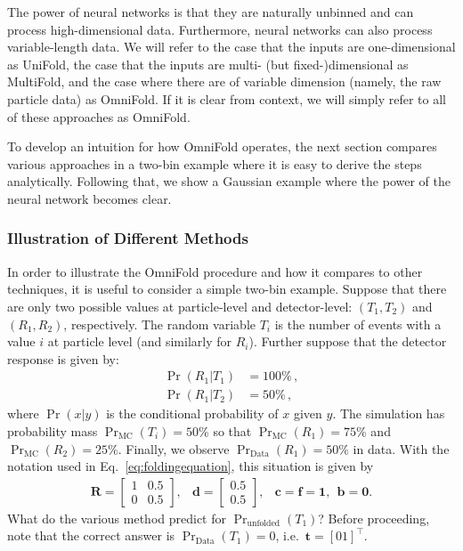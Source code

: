 The power of neural networks is that they are naturally unbinned and can process high-dimensional data.  Furthermore, neural networks can also process variable-length data.  We will refer to the case that the inputs are one-dimensional as UniFold, the case that the inputs are multi- (but fixed-)dimensional as MultiFold, and the case where there are of variable dimension (namely, the raw particle data) as OmniFold.  If it is clear from context, we will simply refer to all of these approaches as OmniFold.

To develop an intuition for how OmniFold operates, the next section compares various approaches in a two-bin example where it is easy to derive the steps analytically.  Following that, we show a Gaussian example where the power of the neural network becomes clear.

\subsubsection{Illustration of Different Methods}

In order to illustrate the OmniFold procedure and how it compares to other techniques, it is useful to consider a simple two-bin example.  Suppose that there are only two possible values at particle-level and detector-level: $(T_1,T_2)$ and $(R_1,R_2)$, respectively.  The random variable $T_i$ is the number of events with a value $i$ at particle level (and similarly for $R_i$).  Further suppose that the detector response is given by:
%
\begin{align}
\Pr(R_1|T_1)&=100\%\,,\\
\Pr(R_1|T_2)&=50\%\,,
\end{align}
%
where $\Pr(x|y)$ is the conditional probability of $x$ given $y$.  The simulation has probability mass $\Pr_\text{MC}(T_i)=50\%$ so that $\Pr_\text{MC}(R_1)=75\%$ and $\Pr_\text{MC}(R_2)=25\%$.   Finally, we observe $\Pr_\text{Data}(R_1)=50\%$ in data.
With the notation used in Eq.~\ref{eq:foldingequation}, this situation is given by
%
\begin{eqnarray}
	\mathbf{R} = \begin{bmatrix} 1 & 0.5\\ 0 & 0.5\end{bmatrix}, & \mathbf{d} = \begin{bmatrix} 0.5\\ 0.5\end{bmatrix}, & \mathbf{c}=\mathbf{f}=\mathbf{1},~~\mathbf{b}=\mathbf{0}.
\end{eqnarray}
%
What do the various method predict for $\Pr_\text{unfolded}(T_1)$?   Before proceeding, note that the correct answer is $\Pr_\text{Data}(T_1)=0$, i.e.\ $\mathbf{t}=[0 1]^\intercal$.

